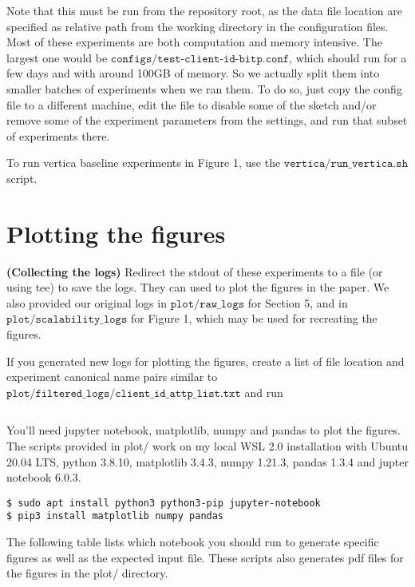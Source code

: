 \documentclass[11pt]{article}
\begin{document}
Note that this must be run from the repository root, as the data file
location are specified as relative path from the working directory in
the configuration files. Most of these experiments are both
computation and memory intensive. The largest one would be
$\texttt{configs/test-client-id-bitp.conf}$, which should run for a
few days and with around 100GB of memory. So we actually split them
into smaller batches of experiments when we ran them. To do so, just
copy the config file to a different machine, edit the file to disable some of the sketch
and/or remove some of the experiment parameters from the settings, and
run that subset of experiments there.

To run vertica baseline experiments in Figure 1, use the
$\texttt{vertica/run\_vertica.sh}$ script.

\section{Plotting the figures}

{\bf (Collecting the logs) } Redirect the stdout of these experiments
to a file (or using tee) to save the logs. They can used to plot the
figures in the paper. We also provided our original logs in
$\texttt{plot/raw\_logs}$ for Section 5, and in
$\texttt{plot/scalability\_logs}$ for Figure 1, which may be used for
recreating the figures.

If you generated new logs for plotting the figures, create a list of
file location and experiment canonical name pairs similar to
$\texttt{plot/filtered\_logs/client\_id\_attp\_list.txt}$ and run
\begin{verbatim}
\end{verbatim}

You'll need jupyter notebook, matplotlib, numpy and pandas to plot the
figures. The scripts provided in plot/ work on my local WSL 2.0
installation with Ubuntu 20.04 LTS, python 3.8.10, matplotlib 3.4.3,
numpy 1.21.3, pandas 1.3.4 and jupter notebook 6.0.3.
\begin{verbatim}
$ sudo apt install python3 python3-pip jupyter-notebook
$ pip3 install matplotlib numpy pandas
\end{verbatim}

The following table lists which notebook you should run to generate
specific figures as well as the expected input file. These scripts
also generates pdf files for the figures in the plot/ directory.
\end{document}

